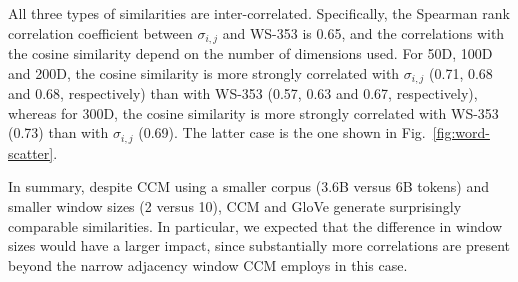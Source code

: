 \documentclass{kais}
\newcommand{\sy}[1]{\sigma_{#1}}
\begin{document}
All three types of similarities are inter-correlated. Specifically, the Spearman rank correlation coefficient
between $\sy{i, j}$ and WS-353 is 0.65, and the correlations with the cosine similarity depend
on the number of dimensions used. For 50D, 100D and 200D, the cosine similarity is more strongly correlated with $\sy{i, j}$ 
(0.71, 0.68 and 0.68, respectively) than with WS-353 (0.57, 0.63 and 0.67, respectively), whereas for 300D,
the cosine similarity is more strongly correlated with WS-353 (0.73) than with $\sy{i, j}$ (0.69). The latter case is the one
shown in Fig.\ \ref{fig:word-scatter}.

In summary, despite CCM using a smaller corpus (3.6B versus 6B tokens) and smaller window sizes (2 versus 10),
CCM and GloVe generate surprisingly comparable similarities. In particular, we expected that the difference in window
sizes would have a larger impact, since substantially more correlations are present beyond the narrow adjacency 
window CCM employs in this case.
\end{document}
